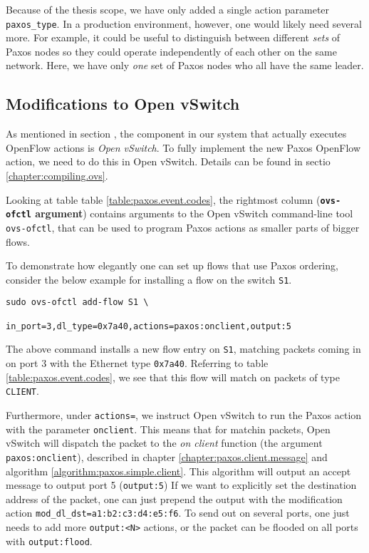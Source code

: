 Because of the thesis scope, we have only added a single action parameter
\texttt{paxos\_type}.
%
In a production environment, however, one would likely need several more.
%
For example, it could be useful to distinguish between different
\textit{sets} of Paxos nodes so they could operate independently of each
other on the same network.
%
Here, we have only \textit{one} set of Paxos nodes who all have the same
leader.

\subsection{Modifications to Open vSwitch}

As mentioned in section , the component in our system
that actually executes OpenFlow actions is \textit{Open vSwitch}.
To fully implement the new Paxos OpenFlow action, we need to do this in Open
vSwitch.  Details can be found in sectio \vref{chapter:compiling.ovs}.

Looking at table table \vref{table:paxos.event.codes}, the rightmost column
(\textbf{\texttt{ovs-ofctl} argument}) contains arguments to the Open
vSwitch command-line tool \texttt{ovs-ofctl}, that can be used to program
Paxos actions as smaller parts of bigger flows.

To demonstrate how elegantly one can set up flows that use Paxos ordering,
consider the below example for installing a flow on the switch
\texttt{S1}.

\begin{Verbatim}
sudo ovs-ofctl add-flow S1 \
               in_port=3,dl_type=0x7a40,actions=paxos:onclient,output:5
\end{Verbatim}

The above command installs a new flow entry on \texttt{S1}, matching packets
coming in on port 3 with the Ethernet type \texttt{0x7a40}.  
Referring to table \vref{table:paxos.event.codes}, we see that this flow
will match on packets of type \texttt{CLIENT}.

Furthermore, under \texttt{actions=}, we instruct Open vSwitch to run the
Paxos action with the parameter \texttt{onclient}.  This means that for
matchin packets, Open vSwitch will dispatch the packet to the \textit{on
client} function (the argument \texttt{paxos:onclient}), described in
chapter \vref{chapter:paxos.client.message} and algorithm
\vref{algorithm:paxos.simple.client}.
%
This algorithm will output an accept message to output port 5
(\texttt{output:5})
If we want to explicitly set the destination address of the packet, one can
just prepend the output with the modification action
\texttt{mod\_dl\_dst=a1:b2:c3:d4:e5:f6}.
To send out on several ports, one just needs to add more \texttt{output:<N>}
actions, or the packet can be flooded on all ports with
\texttt{output:flood}.

